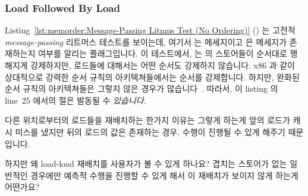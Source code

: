\subsubsection{Load Followed By Load}
\label{sec:memorder:Load Followed By Load}

Listing~\ref{lst:memorder:Message-Passing Litmus Test (No Ordering)}
()
는 고전적 \emph{message-passing} 리트머스 테스트를 보이는데, 여기서  는
메세지이고  은 메세지가 존재하는지 여부를 알리는 플래그입니다.
이 테스트에서,  는  의 스토어들이 순서대로 행해지게
강제하지만, 로드들에 대해서는 어떤 순서도 강제하지 않습니다.
x86 과 같이 상대적으로 강력한 순서 규칙의 아키텍쳐들에서는 순서를 강제합니다.
하지만, 완화된 순서 규칙의 아키텍쳐들은 그렇지 않은 경우가
많습니다~\cite{JadeAlglave2011ppcmem}.
따라서, 이 listing 의 line~25 에서의  절은 발동될 수
\emph{있습니다}.

다른 위치로부터의 로드들을 재배치하는 한가지 이유는 그렇게 하는게 앞의 로드가
캐시 미스를 냈지만 뒤의 로드의 값은 존재하는 경우, 수행이 진행될 수 있게 해주기
때문입니다.

\QuickQuiz{}
	하지만 왜 load-load 재배치를 사용자가 볼 수 있게 하나요?
	겹치는 스토어가 없는 일반적인 경우에만 예측적 수행을 진행할 수 있게
	해서 이 재배치가 보이지 않게 하는게 어떤가요?
	\iffalse

